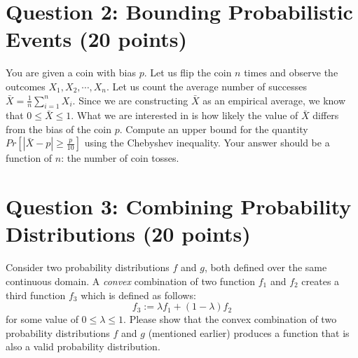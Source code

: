 \documentclass[11pt]{article}
\newcommand{\question}[1]{\section*{\normalsize #1}}
\begin{document}
\question{Question 2: Bounding Probabilistic Events (20 points)}
You are given a coin with bias $p$. Let us flip the coin $n$ times and observe the outcomes $X_1, X_2, \cdots, X_n$. Let us count the average number of successes $\bar{X} = \frac{1}{n}\sum\limits_{i=1}^n X_i$. Since we are constructing $\bar{X}$ as an empirical average, we know that $0\le \bar{X}\le 1$. What we are interested in is how likely the value of $\bar{X}$ differs from the bias of the coin $p$. Compute an upper bound for the quantity $Pr[|\bar{X} - p| \ge \frac{p}{10}]$ using the Chebyshev inequality. Your answer should be a function of $n$: the number of coin tosses.\newpage



































\question{Question 3: Combining Probability Distributions (20 points)}
Consider two probability distributions $f$ and $g$, both defined over the same continuous domain. A \textit{convex} combination of two function $f_1$ and $f_2$ creates a third function $f_3$ which is defined as follows:
$$f_3 := \lambda f_1 + (1-\lambda)f_2$$
for some value of $0\le \lambda \le 1$. Please show that the convex combination of two probability distributions $f$ and $g$ (mentioned earlier) produces a function that is also a valid probability distribution.\newpage
\end{document}
